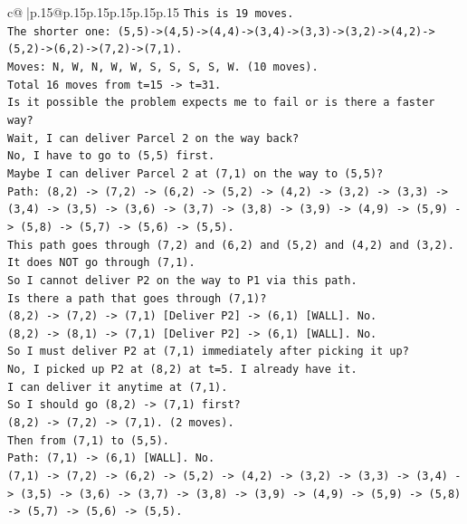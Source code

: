 \documentclass{article}
\begin{document}
{\begin{supertabular}{c@{$\;$}|p{.15\linewidth}@{}p{.15\linewidth}p{.15\linewidth}p{.15\linewidth}p{.15\linewidth}p{.15\linewidth}}
{{{\texttt{This is 19 moves.} \\
\texttt{The shorter one: (5,5){-}>(4,5){-}>(4,4){-}>(3,4){-}>(3,3){-}>(3,2){-}>(4,2){-}>(5,2){-}>(6,2){-}>(7,2){-}>(7,1).} \\
\texttt{Moves: N, W, N, W, W, S, S, S, S, W. (10 moves).} \\
\texttt{Total 16 moves from t=15 {-}> t=31.} \\
\texttt{Is it possible the problem expects me to fail or is there a faster way?} \\
\texttt{Wait, I can deliver Parcel 2 on the way back?} \\
\texttt{No, I have to go to (5,5) first.} \\
\texttt{Maybe I can deliver Parcel 2 at (7,1) on the way to (5,5)?} \\
\texttt{Path: (8,2) {-}> (7,2) {-}> (6,2) {-}> (5,2) {-}> (4,2) {-}> (3,2) {-}> (3,3) {-}> (3,4) {-}> (3,5) {-}> (3,6) {-}> (3,7) {-}> (3,8) {-}> (3,9) {-}> (4,9) {-}> (5,9) {-}> (5,8) {-}> (5,7) {-}> (5,6) {-}> (5,5).} \\
\texttt{This path goes through (7,2) and (6,2) and (5,2) and (4,2) and (3,2).} \\
\texttt{It does NOT go through (7,1).} \\
\texttt{So I cannot deliver P2 on the way to P1 via this path.} \\
\texttt{Is there a path that goes through (7,1)?} \\
\texttt{(8,2) {-}> (7,2) {-}> (7,1) {[}Deliver P2{]} {-}> (6,1) {[}WALL{]}. No.} \\
\texttt{(8,2) {-}> (8,1) {-}> (7,1) {[}Deliver P2{]} {-}> (6,1) {[}WALL{]}. No.} \\
\texttt{So I must deliver P2 at (7,1) immediately after picking it up?} \\
\texttt{No, I picked up P2 at (8,2) at t=5. I already have it.} \\
\texttt{I can deliver it anytime at (7,1).} \\
\texttt{So I should go (8,2) {-}> (7,1) first?} \\
\texttt{(8,2) {-}> (7,2) {-}> (7,1). (2 moves).} \\
\texttt{Then from (7,1) to (5,5).} \\
\texttt{Path: (7,1) {-}> (6,1) {[}WALL{]}. No.} \\
\texttt{(7,1) {-}> (7,2) {-}> (6,2) {-}> (5,2) {-}> (4,2) {-}> (3,2) {-}> (3,3) {-}> (3,4) {-}> (3,5) {-}> (3,6) {-}> (3,7) {-}> (3,8) {-}> (3,9) {-}> (4,9) {-}> (5,9) {-}> (5,8) {-}> (5,7) {-}> (5,6) {-}> (5,5).} \\
}}}
\end{supertabular}}
\end{document}
